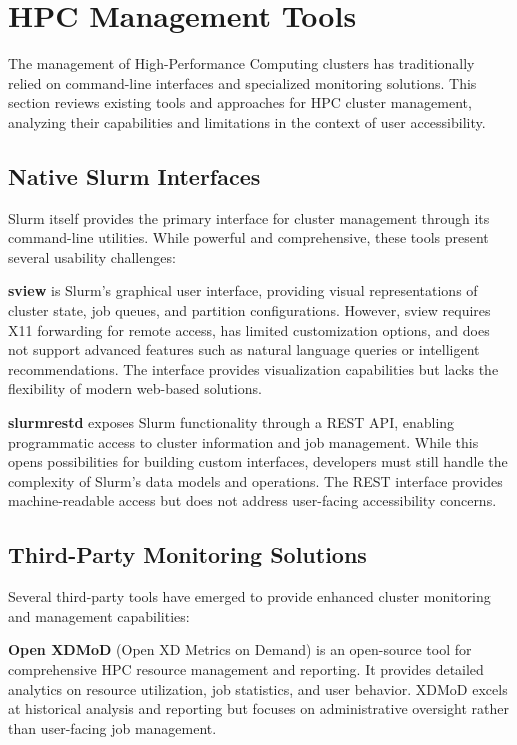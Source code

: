 \section{HPC Management Tools}
\label{sec:hpc-tools}

The management of High-Performance Computing clusters has traditionally relied on command-line interfaces and specialized monitoring solutions. This section reviews existing tools and approaches for HPC cluster management, analyzing their capabilities and limitations in the context of user accessibility.

\subsection{Native Slurm Interfaces}

Slurm itself provides the primary interface for cluster management through its command-line utilities. While powerful and comprehensive, these tools present several usability challenges:

\textbf{sview} is Slurm's graphical user interface, providing visual representations of cluster state, job queues, and partition configurations. However, sview requires X11 forwarding for remote access, has limited customization options, and does not support advanced features such as natural language queries or intelligent recommendations. The interface provides visualization capabilities but lacks the flexibility of modern web-based solutions.

\textbf{slurmrestd} exposes Slurm functionality through a REST API, enabling programmatic access to cluster information and job management. While this opens possibilities for building custom interfaces, developers must still handle the complexity of Slurm's data models and operations. The REST interface provides machine-readable access but does not address user-facing accessibility concerns.

\subsection{Third-Party Monitoring Solutions}

Several third-party tools have emerged to provide enhanced cluster monitoring and management capabilities:

\textbf{Open XDMoD} (Open XD Metrics on Demand) is an open-source tool for comprehensive HPC resource management and reporting. It provides detailed analytics on resource utilization, job statistics, and user behavior. XDMoD excels at historical analysis and reporting but focuses on administrative oversight rather than user-facing job management.

